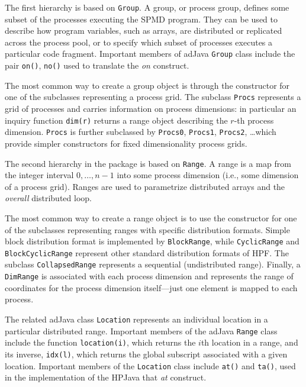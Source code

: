 The first hierarchy is based on \texttt{Group}.  A group, or
process group, defines some subset of the processes executing the SPMD
program.  They can be used to describe how program variables,
such as arrays, are distributed or replicated across the process pool,
or to specify which subset of processes executes a particular code
fragment.  Important members of adJava {\tt Group} class include the
pair {\tt on()}, {\tt no()} used to translate the {\em on} construct.

The most common way to create a group object is through the
constructor for one of the subclasses representing a process
grid.  The subclass \texttt{Procs} represents a grid of processes
and carries information on process dimensions: in particular an
inquiry function {\tt dim(r)} returns a range object describing the
$r$-th process dimension.  {\tt Procs} is further subclassed by
\texttt{Procs0}, \texttt{Procs1}, \texttt{Procs2}, \ldots which
provide simpler constructors for fixed dimensionality process grids.

The second hierarchy in the package is based on \texttt{Range}.
A range is a map from the integer interval $0,\ldots,n-1$ into
some process dimension (i.e., some dimension of a process grid).
Ranges are used to parametrize distributed arrays and the
{\em overall} distributed loop.

The most common way to create a range object is to use the constructor
for one of the subclasses representing ranges with specific
distribution formats.  
Simple block distribution format is implemented by
{\tt BlockRange}, while \texttt{CyclicRange} and \texttt{BlockCyclicRange}
represent other standard distribution formats of HPF.  The subclass
\texttt{CollapsedRange} represents a sequential (undistributed range).
Finally, a \texttt{DimRange} is associated with each process dimension
and represents the range of coordinates for the process dimension
itself---just one element is mapped to each process.

The related adJava class \texttt{Location} represents an individual
location in a particular distributed range.  Important members of the
adJava {\tt Range} class include the function {\tt location(i)}, which
returns the $i$th location in a range, and its inverse, {\tt idx(l)},
which returns the global subscript associated with a given location.
Important members of the {\tt Location} class include {\tt at()} and
{\tt ta()}, used in the implementation of the HPJava that {\em at}
construct.

